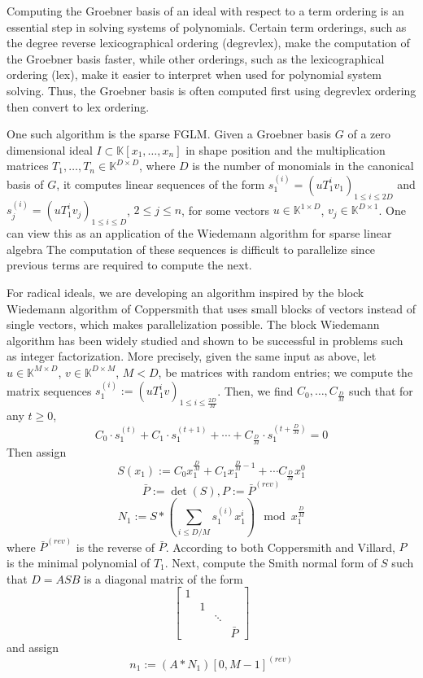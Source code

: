\documentclass[12pt]{article}
\begin{document}
Computing the Groebner basis of an ideal with respect to a term ordering 
is an essential step in solving systems of polynomials.
Certain term orderings, such as the degree reverse lexicographical ordering (degrevlex),
make the computation of the Groebner basis faster, while other orderings, 
such as the lexicographical ordering (lex), make it easier to interpret when
used for polynomial system solving. Thus, the Groebner basis is often computed
first using degrevlex ordering then convert to lex ordering.

One such algorithm is the sparse FGLM. Given a Groebner basis $G$ of a zero 
dimensional ideal $I \subset \mathbb{K}[x_1, \dots, x_n]$ 
in shape position and the multiplication matrices $T_1,\dots, T_n \in \mathbb{K}^{D \times D}$,
where $D$ is the number of monomials in the canonical basis of $G$, it computes 
linear sequences of the form $s_1^{(i)} = (uT_1^iv_1)_{1\le i \le 2D}$ and
$s_j^{(i)} = (uT_1^iv_j)_{1\le i \le D}$, $2 \le j \le n$, for some vectors $u \in \mathbb{K}^{1 \times D}$,
$v_j \in \mathbb{K}^{D\times 1}$. One can view this as an application of the Wiedemann algorithm 
for sparse linear algebra The computation of these sequences is difficult to parallelize 
since previous terms are required to compute the next. 

For radical ideals, we are developing an algorithm inspired by the block Wiedemann algorithm of Coppersmith
that uses small blocks of vectors instead of single vectors, 
which makes parallelization possible. The block Wiedemann algorithm has been 
widely studied and shown to be successful in problems such as integer factorization.
More precisely, given the same input as above, let $u \in \mathbb{K}^{M \times D}$, $v \in \mathbb{K}^{D \times M}$, $M < D$, be 
matrices with random entries; we compute the matrix sequences $s_1^{(i)} := (uT_1^iv)_{1\le i \le \frac{2D}{M}}$. 
Then, we find $C_0, \dots, C_\frac{D}{M}$ such that for any $t \ge 0$,
$$ C_0 \cdot s_1^{(t)} + C_1 \cdot s_1^{(t+1)} + \cdots + C_{\frac{D}{M}} \cdot s_1^{(t+\frac{D}{M})}  = 0$$
Then assign
$$ S(x_1) := C_0  x_1^{\frac{D}{M}} + C_1  x_1^{\frac{D}{M} - 1} + \cdots C_{\frac{D}{M}} x_1^0$$
$$ \bar{P} := \det(S) , P := \bar{P}^{(rev)}$$
$$ N_1 := S * (\sum_{i\le D/M} s_1^{(i)} x_1^i) \mod x_1^{\frac{D}{M}}$$
where $\bar{P}^{(rev)}$ is the reverse of $\bar{P}$. According to both Coppersmith and Villard,
$P$ is the minimal polynomial of $T_1$. Next, compute the Smith normal form 
of $S$ such that $D = A S B$ is a diagonal matrix of the form
$$\begin{bmatrix}
	1 &  &        & \\
	  & 1&        &  \\ 
	  &  & \ddots & \\
	  &  &        & \bar{P}
\end{bmatrix}$$
and assign
$$ n_1 := (A*N_1)[0,M-1]^{(rev)}$$
\end{document}
